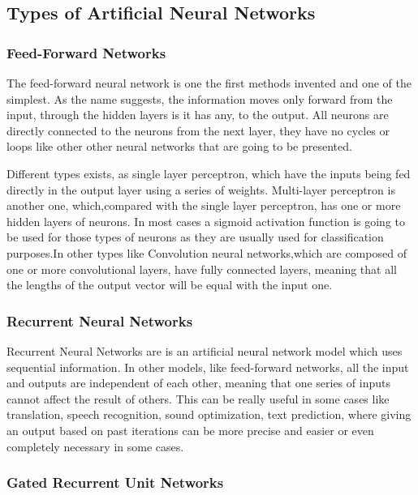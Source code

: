 \subsection{Types of Artificial Neural Networks}

\subsubsection{Feed-Forward Networks}

The feed-forward neural network is one the first methods invented and one of the simplest. As the name suggests, the information moves only forward from the input, through the hidden layers is it has any, to the output. All neurons are directly connected to the neurons from the next layer, they have no cycles or loops like other other neural networks that are going to be presented.

Different types exists, as single layer perceptron, which have the inputs being fed directly in the output layer using a series of weights. Multi-layer perceptron is another one, which,compared with the single layer perceptron, has one or more hidden layers of neurons.
In most cases a sigmoid activation function is going to be used for those types of neurons as they are usually used for classification purposes.In other types like Convolution neural networks,which are composed of one or more convolutional layers, have fully connected layers, meaning that all the lengths of the output vector will be equal with the input one.

\subsubsection{Recurrent Neural Networks}

Recurrent Neural Networks are is an artificial neural network model which uses sequential information. In other models, like feed-forward networks, all the input and outputs are independent of each other, meaning that one series of inputs cannot affect the result of others.
This can be really useful in some cases like translation, speech recognition, sound optimization, text prediction, where giving an output based on past iterations can be more precise and easier or even completely necessary in some cases.

\newpage
\subsubsection{Gated Recurrent Unit Networks} 

